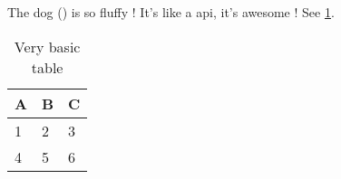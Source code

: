 

The dog () is so fluffy !
It's like a \gls{api}, it's awesome ! See \cref{tab:abc}.

\begin{table}[h]
    \centering
    \begin{tabular}{l | l | l}
        A & B & C \\
        \hline
        1 & 2 & 3 \\
        4 & 5 & 6
    \end{tabular}
    \caption{Very basic table}
    \label{tab:abc}
\end{table}

\lipsum[1-20]